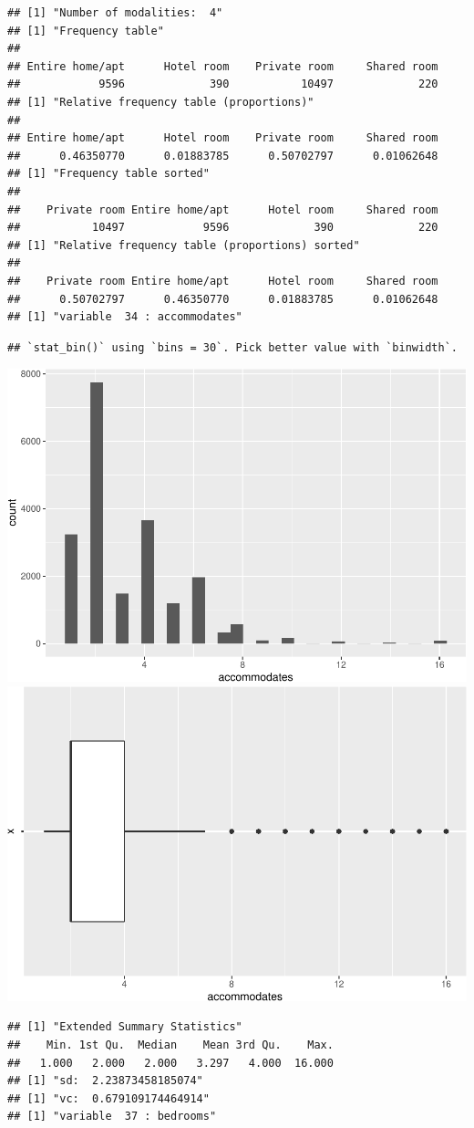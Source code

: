 \begin{verbatim}
## [1] "Number of modalities:  4"
## [1] "Frequency table"
## 
## Entire home/apt      Hotel room    Private room     Shared room 
##            9596             390           10497             220 
## [1] "Relative frequency table (proportions)"
## 
## Entire home/apt      Hotel room    Private room     Shared room 
##      0.46350770      0.01883785      0.50702797      0.01062648 
## [1] "Frequency table sorted"
## 
##    Private room Entire home/apt      Hotel room     Shared room 
##           10497            9596             390             220 
## [1] "Relative frequency table (proportions) sorted"
## 
##    Private room Entire home/apt      Hotel room     Shared room 
##      0.50702797      0.46350770      0.01883785      0.01062648 
## [1] "variable  34 : accommodates"
\end{verbatim}

\begin{verbatim}
## `stat_bin()` using `bins = 30`. Pick better value with `binwidth`.
\end{verbatim}

\includegraphics[width=0.5\linewidth]{anal_files/figure-latex/figures-side-16}
\includegraphics[width=0.5\linewidth]{anal_files/figure-latex/figures-side-17}

\begin{verbatim}
## [1] "Extended Summary Statistics"
##    Min. 1st Qu.  Median    Mean 3rd Qu.    Max. 
##   1.000   2.000   2.000   3.297   4.000  16.000 
## [1] "sd:  2.23873458185074"
## [1] "vc:  0.679109174464914"
## [1] "variable  37 : bedrooms"
\end{verbatim}

